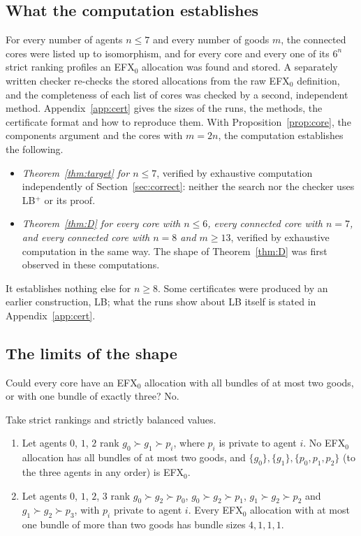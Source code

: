 \documentclass[runningheads,11pt]{llncs}
\newcommand{\efxz}{\texorpdfstring{\mbox{EFX$_0$}}{EFX0}}
\newcommand{\LBp}{\texorpdfstring{\mbox{LB$^{+}$}}{LB+}}
\begin{document}
\subsection{What the computation establishes}\label{sec:certn7}

For every number of agents $n\le7$ and every number of goods $m$, the connected cores were listed up to isomorphism, and for every core and every one of its $6^n$ strict ranking profiles an \efxz{} allocation was found and stored. A separately written checker re-checks the stored allocations from the raw \efxz{} definition, and the completeness of each list of cores was checked by a second, independent method. Appendix~\ref{app:cert} gives the sizes of the runs, the methods, the certificate format and how to reproduce them. With Proposition~\ref{prop:core}, the components argument and the cores with $m=2n$, the computation establishes the following.
\begin{itemize}
\item \emph{Theorem~\ref{thm:target} for $n\le7$}, verified by exhaustive computation independently of Section~\ref{sec:correct}: neither the search nor the checker uses \LBp{} or its proof.
\item \emph{Theorem~\ref{thm:D} for every core with $n\le6$, every connected core with $n=7$, and every connected core with $n=8$ and $m\ge13$}, verified by exhaustive computation in the same way. The shape of Theorem~\ref{thm:D} was first observed in these computations.
\end{itemize}
It establishes nothing else for $n\ge8$. Some certificates were produced by an earlier construction, LB; what the runs show about LB itself is stated in Appendix~\ref{app:cert}.

\subsection{The limits of the shape}\label{sec:limits}

Could every core have an \efxz{} allocation with all bundles of at most two goods, or with one bundle of exactly three? No.

\begin{proposition}\label{prop:neg}
Take strict rankings and strictly balanced values.
\begin{enumerate}
\item[(a)] Let agents $0$, $1$, $2$ rank $g_0\succ g_1\succ p_i$, where $p_i$ is private to agent $i$. No \efxz{} allocation has all bundles of at most two goods, and $\{g_0\},\{g_1\},\{p_0,p_1,p_2\}$ (to the three agents in any order) is \efxz{}.
\item[(b)] Let agents $0$, $1$, $2$, $3$ rank $g_0\succ g_2\succ p_0$, $g_0\succ g_2\succ p_1$, $g_1\succ g_2\succ p_2$ and $g_1\succ g_2\succ p_3$, with $p_i$ private to agent $i$. Every \efxz{} allocation with at most one bundle of more than two goods has bundle sizes $4,1,1,1$.
\end{enumerate}
\end{proposition}
\end{document}
